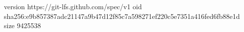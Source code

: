 version https://git-lfs.github.com/spec/v1
oid sha256:e9b857387adc21147a9b47d12f85c7a598271ef220c5e7351a416fed6fb88e1d
size 9425538
